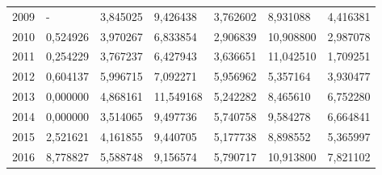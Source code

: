 \begin{table}
\begin{tabular}{p{1cm}p{2cm}p{2cm}p{2cm}p{2cm}p{2cm}p{2cm}}
 2009 &                                   - &     3,845025 &                                           9,426438 &                                           3,762602 &                            8,931088 & 4,416381 \\
 2010 &                            0,524926 &     3,970267 &                                           6,833854 &                                           2,906839 &                           10,908800 & 2,987078 \\
 2011 &                            0,254229 &     3,767237 &                                           6,427943 &                                           3,636651 &                           11,042510 & 1,709251 \\
 2012 &                            0,604137 &     5,996715 &                                           7,092271 &                                           5,956962 &                            5,357164 & 3,930477 \\
 2013 &                            0,000000 &     4,868161 &                                          11,549168 &                                           5,242282 &                            8,465610 & 6,752280 \\
 2014 &                            0,000000 &     3,514065 &                                           9,497736 &                                           5,740758 &                            9,584278 & 6,664841 \\
 2015 &                            2,521621 &     4,161855 &                                           9,440705 &                                           5,177738 &                            8,898552 & 5,365997 \\
 2016 &                            8,778827 &     5,588748 &                                           9,156574 &                                           5,790717 &                           10,913800 & 7,821102 \\
\bottomrule
\end{tabular}
\end{table}

